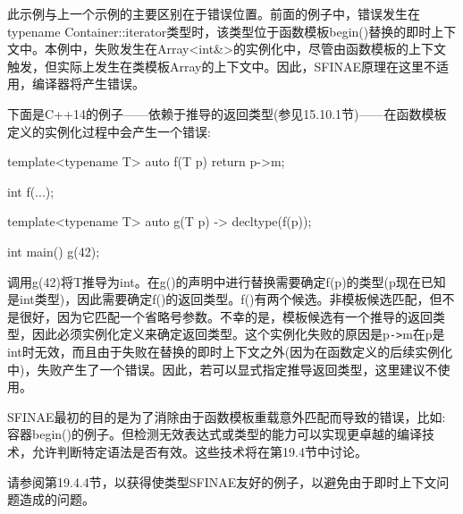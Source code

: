 此示例与上一个示例的主要区别在于错误位置。前面的例子中，错误发生在typename Container::iterator类型时，该类型位于函数模板begin()替换的即时上下文中。本例中，失败发生在Array<int\&>的实例化中，尽管由函数模板的上下文触发，但实际上发生在类模板Array的上下文中。因此，SFINAE原理在这里不适用，编译器将产生错误。

下面是C++14的例子——依赖于推导的返回类型(参见15.10.1节)——在函数模板定义的实例化过程中会产生一个错误:

\begin{cpp}
template<typename T> auto f(T p) {
	return p->m;
}

int f(...);

template<typename T> auto g(T p) -> decltype(f(p));

int main()
{
	g(42);
}
\end{cpp}

调用g(42)将T推导为int。在g()的声明中进行替换需要确定f(p)的类型(p现在已知是int类型)，因此需要确定f()的返回类型。f()有两个候选。非模板候选匹配，但不是很好，因为它匹配一个省略号参数。不幸的是，模板候选有一个推导的返回类型，因此必须实例化定义来确定返回类型。这个实例化失败的原因是p\texttt{->}m在p是int时无效，而且由于失败在替换的即时上下文之外(因为在函数定义的后续实例化中)，失败产生了一个错误。因此，若可以显式指定推导返回类型，这里建议不使用。

SFINAE最初的目的是为了消除由于函数模板重载意外匹配而导致的错误，比如:容器begin()的例子。但检测无效表达式或类型的能力可以实现更卓越的编译技术，允许判断特定语法是否有效。这些技术将在第19.4节中讨论。

请参阅第19.4.4节，以获得使类型SFINAE友好的例子，以避免由于即时上下文问题造成的问题。



